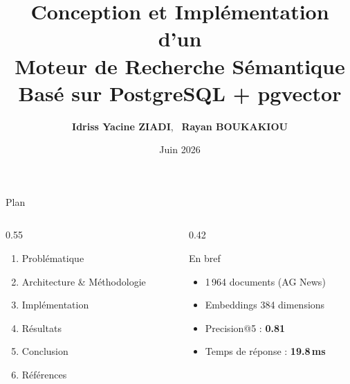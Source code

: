 \documentclass[aspectratio=169, 10pt]{beamer}
\title{Conception et Impl\'{e}mentation d'un\\Moteur de Recherche S\'{e}mantique\\
\normalsize Bas\'{e} sur PostgreSQL + pgvector}
\author{%
  \textbf{\textcolor{ASTRAnavy}{Idriss Yacine ZIADI}}\textcolor{ASTRAnavy}{,~}%
  \textbf{\textcolor{ASTRAnavy}{Rayan BOUKAKIOU}}%
}
\date{Juin 2026}
\begin{document}

\begin{frame}[plain]
  \titlepage
\end{frame}

\begin{frame}{Plan}
  \begin{columns}[T]
    \begin{column}{0.55\textwidth}
      \begin{enumerate}
        \setlength{\itemsep}{0.8em}
        \item {\large Probl\'{e}matique}
        \item {\large Architecture \& M\'{e}thodologie}
        \item {\large Impl\'{e}mentation}
        \item {\large R\'{e}sultats}
        \item {\large Conclusion}
        \item {\large R\'{e}f\'{e}rences}
      \end{enumerate}
    \end{column}
    \begin{column}{0.42\textwidth}
      \begin{block}{En bref}
        \begin{itemize}
          \item 1\,964 documents (AG News)
          \item Embeddings 384 dimensions
          \item Precision@5 : \textbf{0.81}
          \item Temps de r\'{e}ponse : \textbf{19.8\,ms}
        \end{itemize}
      \end{block}
    \end{column}
  \end{columns}
\end{frame}
\end{document}
